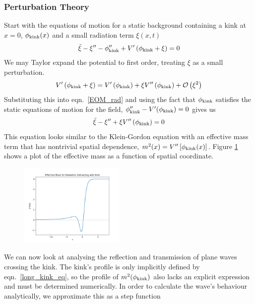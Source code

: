 \documentclass[11pt, oneside]{article}  	%
\numberwithin{equation}{section}
\begin{document}
 \subsubsection{Perturbation Theory} \label{pert_theory}
Start with the equations of motion for a static background containing a kink at $x=0$, $\phi_\textup{kink}(x)$ and a small radiation term $\xi(x,t)$
\begin{equation}\label{EOM_rad}
\ddot{\xi} - \xi'' - \phi''_\textup{kink} + V' \left( \phi_\textup{kink} + \xi \right)= 0
\end{equation}
We may Taylor expand the potential to first order, treating $\xi$ as a small perturbation.
 \begin{equation}
 V' \left( \phi_\textup{kink} + \xi \right) = V' \left( \phi_\textup{kink} \right ) + \xi V'' \left( \phi_\textup{kink}\right) + \mathcal{O}\left(\xi^2 \right )
 \end{equation}
 Substituting this into eqn.~\ref{EOM_rad} and using the fact that $\phi_\textup{kink}$ satisfies the static equations of motion for the field, $\phi_\textup{kink}'' - V'(\phi_\textup{kink}) = 0$ gives us
 \begin{equation}
\ddot{\xi} - \xi'' + \xi V'' \left( \phi_\textup{kink}\right)= 0
\end{equation}
This equation looks similar to the Klein-Gordon equation with an effective mass term that has nontrivial spatial dependence, $m^2(x) = V''\left[\phi_\textup{kink}(x)\right]$. Figure \ref{mass_term} shows a plot of the effective mass as a function of spatial coordinate.\par
 \begin{figure}
\centering
 \includegraphics[width=0.45\textwidth]{mass_term.png}
  \label{mass_term}
\end{figure}
We can now look at analysing the reflection and transmission of plane waves crossing the kink. The kink's profile is only implicitly defined by eqn.~\ref{long_kink_eq}, so the profile of $m^2(\phi_{\textup{kink}})$ also lacks an explicit expression and must be determined numerically. In order to calculate the wave's behaviour analytically, we approximate this as a step function
\end{document}

